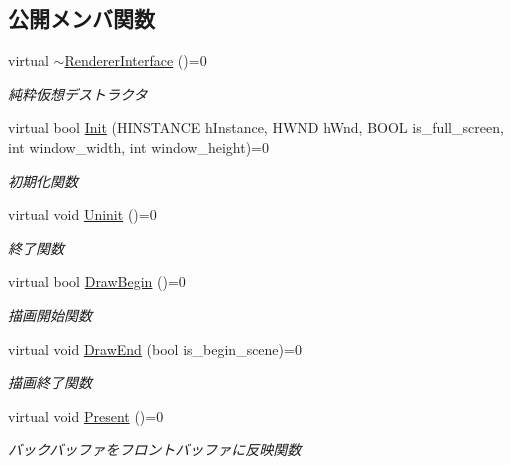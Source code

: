 \subsection*{公開メンバ関数}
\begin{DoxyCompactItemize}
\item 
virtual \mbox{\hyperlink{class_renderer_interface_a571638543a7544e023dc186f7dfc7523}{$\sim$\+Renderer\+Interface}} ()=0
\begin{DoxyCompactList}\small\item\em 純粋仮想デストラクタ \end{DoxyCompactList}\item 
virtual bool \mbox{\hyperlink{class_renderer_interface_aabef76c27c2332c1af2dbcf7e8de5d38}{Init}} (H\+I\+N\+S\+T\+A\+N\+CE h\+Instance, H\+W\+ND h\+Wnd, B\+O\+OL is\+\_\+full\+\_\+screen, int window\+\_\+width, int window\+\_\+height)=0
\begin{DoxyCompactList}\small\item\em 初期化関数 \end{DoxyCompactList}\item 
virtual void \mbox{\hyperlink{class_renderer_interface_ada105489f9db98e7e9542b278699d558}{Uninit}} ()=0
\begin{DoxyCompactList}\small\item\em 終了関数 \end{DoxyCompactList}\item 
virtual bool \mbox{\hyperlink{class_renderer_interface_a86a487deb4e4207a67410d00ec670fd7}{Draw\+Begin}} ()=0
\begin{DoxyCompactList}\small\item\em 描画開始関数 \end{DoxyCompactList}\item 
virtual void \mbox{\hyperlink{class_renderer_interface_a0034a44420e4746062e70e4d66d3bee2}{Draw\+End}} (bool is\+\_\+begin\+\_\+scene)=0
\begin{DoxyCompactList}\small\item\em 描画終了関数 \end{DoxyCompactList}\item 
virtual void \mbox{\hyperlink{class_renderer_interface_aa9e12d2a2f5ffa351c457cfc7806b6f1}{Present}} ()=0
\begin{DoxyCompactList}\small\item\em バックバッファをフロントバッファに反映関数 \end{DoxyCompactList}\end{DoxyCompactItemize}


